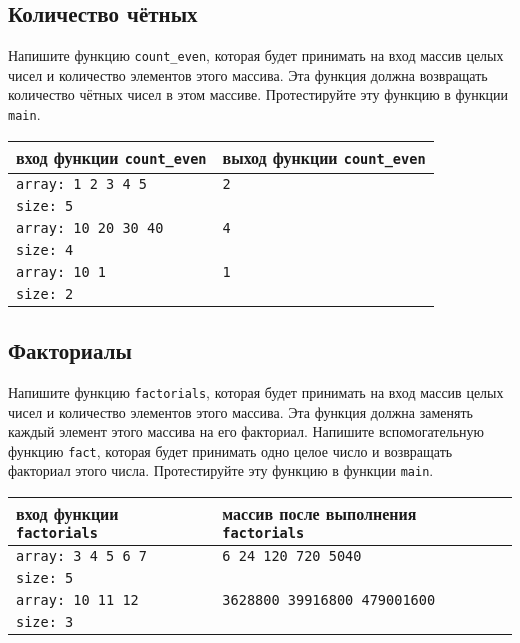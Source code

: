 \documentclass{article}
\begin{document}
\subsection{Количество чётных}
Напишите функцию \texttt{count\_even}, которая будет принимать на вход массив целых чисел и количество элементов этого массива. Эта функция должна возвращать количество чётных чисел в этом массиве. Протестируйте эту функцию в функции \texttt{main}.
\begin{center}
\begin{tabular}{ l | l }
 вход функции \texttt{count\_even} & выход функции \texttt{count\_even} \\ \hline
 \texttt{array: 1 2 3 4 5} & \texttt{2} \\
 \texttt{size: 5} & \\ \hline
 \texttt{array: 10 20 30 40} & \texttt{4} \\
 \texttt{size: 4} & \\ \hline
 \texttt{array: 10 1} & \texttt{1} \\
 \texttt{size: 2} & \\
\end{tabular}
\end{center} 
 

\subsection{Факториалы}
Напишите функцию \texttt{factorials}, которая будет принимать на вход массив целых чисел и количество элементов этого массива. Эта функция должна заменять каждый элемент этого массива на его факториал. Напишите вспомогательную функцию \texttt{fact}, которая будет принимать одно целое число и возвращать факториал этого числа. Протестируйте эту функцию в функции \texttt{main}.
\begin{center}
\begin{tabular}{ l | l }
 вход функции \texttt{factorials} & массив после выполнения \texttt{factorials} \\ \hline
 \texttt{array: 3 4 5 6 7} & \texttt{6 24 120 720 5040} \\
 \texttt{size: 5} & \\ \hline
 \texttt{array: 10 11 12} & \texttt{3628800 39916800 479001600} \\
 \texttt{size: 3} & \\
\end{tabular}
\end{center} 
\end{document}
